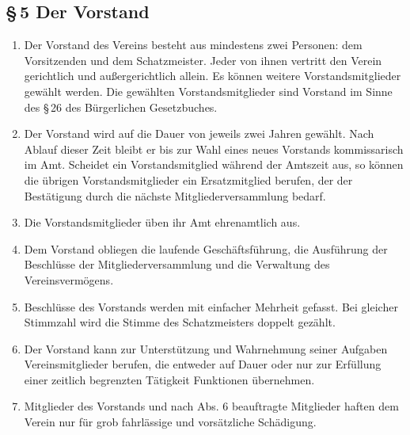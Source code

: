 \documentclass[12pt,a4paper]{article}
\begin{document}
\subsection*{§\,5 Der Vorstand}
\begin{enumerate}
\item Der Vorstand des Vereins besteht aus mindestens zwei Personen: dem Vorsitzenden und dem Schatzmeister. Jeder von ihnen vertritt den Verein gericht\-lich und außergerichtlich allein. Es können weitere Vorstandsmitglieder gewählt werden. Die gewählten Vorstandsmitglieder sind Vorstand im Sinne des §\,26 des Bürgerlichen Gesetzbuches.
\item Der Vorstand wird auf die Dauer von jeweils zwei Jahren gewählt. Nach Ablauf dieser Zeit bleibt er bis zur Wahl eines neues Vorstands kommissarisch im Amt. Scheidet ein Vorstandsmitglied während der Amtszeit aus, so können die übrigen Vorstandsmitglieder ein Ersatzmitglied berufen, der der Bestätigung durch die nächste Mitgliederversammlung bedarf.
\item Die Vorstandsmitglieder üben ihr Amt ehrenamtlich aus.
\item Dem Vorstand obliegen die laufende Geschäftsführung, die Ausführung der Beschlüsse der Mitgliederversammlung und die Verwaltung des Vereinsvermögens.
\item Beschlüsse des Vorstands werden mit einfacher Mehrheit gefasst. Bei gleicher Stimmzahl wird die Stimme des Schatzmeisters doppelt gezählt.
\item Der Vorstand kann zur Unterstützung und Wahrnehmung seiner Aufgaben Vereinsmitglieder berufen, die entweder auf Dauer oder nur zur Erfüllung einer zeitlich begrenzten Tätigkeit Funktionen übernehmen.
\item Mitglieder des Vorstands und nach Abs. 6 beauftragte Mitglieder haften dem Verein nur für grob fahrlässige und vorsätzliche Schädigung. 
\end{enumerate}
\end{document}
